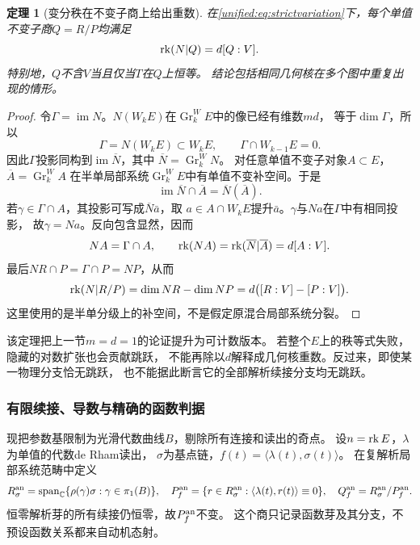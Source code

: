\documentclass[11pt,a4paper,oneside]{ctexart}
\theoremstyle{cnplain}
\newtheorem{theorem}{定理}[section]
\theoremstyle{definition}
\theoremstyle{remark}
\newcommand{\im}{\operatorname{im}}
\numberwithin{equation}{section}
\begin{document}
\begin{theorem}[变分秩在不变子商上给出重数]\label{unified:thm:strictmultiplicity}
在\eqref{unified:eq:strictvariation}下，每个单值不变子商$Q=R/P$均满足
\begin{equation}\label{unified:eq:rankmultiplicity}
 \operatorname{rk}(N|Q)=d[Q:V].
\end{equation}
特别地，$Q$不含$V$当且仅当$T$在$Q$上恒等。
结论包括相同几何核在多个图中重复出现的情形。
\end{theorem}
\begin{proof}
令$\Gamma=\im N$。$N(W_kE)$在$\operatorname{Gr}_k^WE$中的像已经有维数$md$，
等于$\dim\Gamma$，所以
\[
 \Gamma=N(W_kE)\subset W_kE,\qquad
 \Gamma\cap W_{k-1}E=0.
\]
因此$\Gamma$投影同构到$\im\overline N$，其中
$\overline N=\operatorname{Gr}_k^WN$。
对任意单值不变子对象$A\subset E$，$\overline A=\operatorname{Gr}_k^WA$
在半单局部系统$\operatorname{Gr}_k^WE$中有单值不变补空间。于是
\[
 \im\overline N\cap\overline A=\overline N(\overline A).
\]
若$\gamma\in\Gamma\cap A$，其投影可写成$\overline N\bar a$，取
$a\in A\cap W_kE$提升$\bar a$。$\gamma$与$Na$在$\Gamma$中有相同投影，
故$\gamma=Na$。反向包含显然，因而
\[
 NA=\Gamma\cap A,\qquad
 \operatorname{rk}(NA)=\operatorname{rk}(\overline N|\overline A)=d[A:V].
\]
最后$NR\cap P=\Gamma\cap P=NP$，从而
\[
 \operatorname{rk}(N|R/P)=\dim NR-\dim NP
           =d\bigl([R:V]-[P:V]\bigr).
\]
这里使用的是半单分级上的补空间，不是假定原混合局部系统分裂。
\end{proof}

该定理把上一节$m=d=1$的论证提升为可计数版本。
若整个$E$上的秩等式失败，隐藏的对数扩张也会贡献跳跃，
不能再除以$d$解释成几何核重数。反过来，即使某一物理分支恰无跳跃，
也不能据此断言它的全部解析续接分支均无跳跃。

\subsubsection{有限续接、导数与精确的函数判据}
现把参数基限制为光滑代数曲线$B$，剔除所有连接和读出的奇点。
设$n=\operatorname{rk} E$，$\lambda$为单值的代数de Rham读出，
$\sigma$为基点链，$f(t)=\langle\lambda(t),\sigma(t)\rangle$。
在复解析局部系统范畴中定义
\[
 R_\sigma^{\rm an}
   =\operatorname{span}_{\mathbb C}\{\rho(\gamma)\sigma:\gamma\in\pi_1(B)\},
 \quad
 P_f^{\rm an}
   =\{r\in R_\sigma^{\rm an}:
               \langle\lambda(t),r(t)\rangle\equiv0\},
 \quad Q_f^{\rm an}=R_\sigma^{\rm an}/P_f^{\rm an}.
\]
恒零解析芽的所有续接仍恒零，故$P_f^{\rm an}$不变。
这个商只记录函数芽及其分支，不预设函数关系都来自动机态射。
\end{document}
